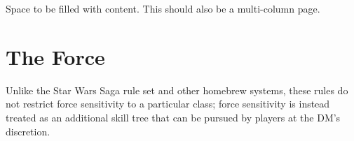\documentclass[a4paper,10pt,final,twocolumn,oneside]{book}
\begin{document}
Space to be filled with content. This should also be a multi-column page.


\clearpage

\section{The Force} %
\label{sec:the_force}

Unlike the Star Wars Saga rule set and other homebrew systems, these rules do not restrict force sensitivity to a particular class; force sensitivity is instead treated as an additional skill tree that can be pursued by players at the DM's discretion.



\end{document}
